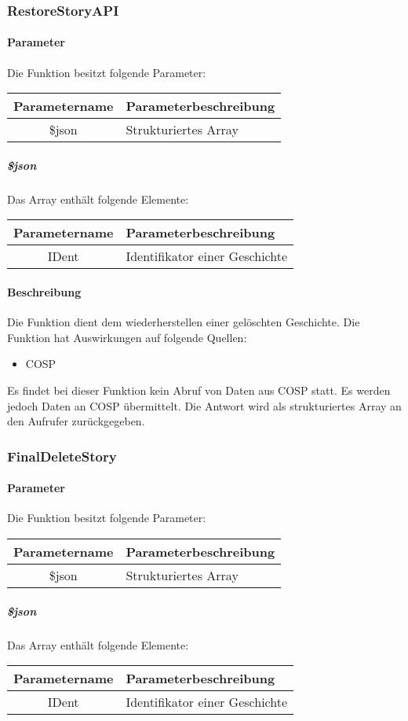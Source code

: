 \subsubsection{RestoreStoryAPI}
\paragraph{Parameter} Die Funktion besitzt folgende Parameter:
\begin{table}[H]
	\begin{tabular}{|c|p{11cm}|}
		\hline
		\textbf{Parametername} & \textbf{Parameterbeschreibung} \\ \hline
		\$json & Strukturiertes Array \\ \hline
	\end{tabular}
\end{table}
\subparagraph{\$json}Das Array enthält folgende Elemente:
\begin{table}[H]
	\begin{tabular}{|c|p{11cm}|}
		\hline
		\textbf{Parametername} & \textbf{Parameterbeschreibung} \\ \hline
		IDent & Identifikator einer Geschichte \\ \hline
	\end{tabular}
\end{table}
\paragraph{Beschreibung} Die Funktion dient dem wiederherstellen einer gelöschten Geschichte. Die Funktion hat Auswirkungen auf folgende Quellen:
\begin{itemize}
	\item COSP
\end{itemize}
Es findet bei dieser Funktion kein Abruf von Daten aus {\glqq COSP\grqq} statt. Es werden jedoch Daten an {\glqq COSP\grqq} übermittelt. Die Antwort wird als strukturiertes Array an den Aufrufer zurückgegeben.
\subsubsection{FinalDeleteStory}
\paragraph{Parameter} Die Funktion besitzt folgende Parameter:
\begin{table}[H]
	\begin{tabular}{|c|p{11cm}|}
		\hline
		\textbf{Parametername} & \textbf{Parameterbeschreibung} \\ \hline
		\$json & Strukturiertes Array \\ \hline
	\end{tabular}
\end{table}
\subparagraph{\$json}Das Array enthält folgende Elemente:
\begin{table}[H]
	\begin{tabular}{|c|p{11cm}|}
		\hline
		\textbf{Parametername} & \textbf{Parameterbeschreibung} \\ \hline
		IDent & Identifikator einer Geschichte \\ \hline
	\end{tabular}
\end{table}
